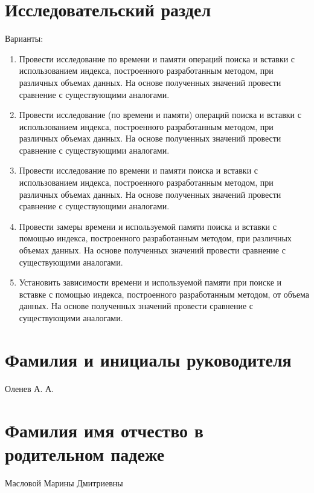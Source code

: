 \documentclass{bmstu}
\begin{document}
\section*{Исследовательский раздел}

Варианты:
\begin{enumerate}
    \item Провести исследование по времени и памяти операций поиска и вставки с
        использованием индекса, построенного разработанным методом, при
        различных объемах данных. На основе полученных значений провести
        сравнение с существующими аналогами.

    \item Провести исследование (по времени и памяти) операций поиска и вставки с
        использованием индекса, построенного разработанным методом, при
        различных объемах данных. На основе полученных значений провести
        сравнение с существующими аналогами.

    \item Провести исследование по времени и памяти поиска и вставки с
        использованием индекса, построенного разработанным методом, при
        различных объемах данных. На основе полученных значений провести
        сравнение с существующими аналогами.

    \item Провести замеры времени и используемой памяти поиска и вставки с
        помощью индекса, построенного разработанным методом, при различных
        объемах данных. На основе полученных значений провести сравнение с
        существующими аналогами.

    \item Установить зависимости времени и используемой памяти при поиске и
        вставке с помощью индекса, построенного разработанным методом, от объема
        данных. На основе полученных значений провести сравнение с существующими
        аналогами.
\end{enumerate}

\section*{Фамилия и инициалы руководителя}

Оленев А. А.

\section*{Фамилия имя отчество в родительном падеже}

Масловой Марины Дмитриевны
\end{document}
